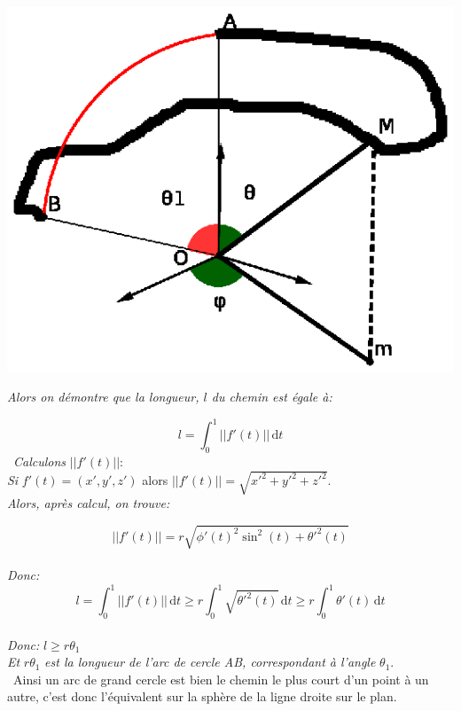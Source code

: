 \documentclass[a4paper, 12pt, twoside]{book}
\begin{document}
\includegraphics[scale=0.9]{figures/coordonneespheriques1.eps} 


\textit{Alors on démontre que la longueur, $l$ du chemin est égale à:}\

 $$ l=\int_{0}^{1} ||{f'}(t)|| \, \mathrm{d}t $$\
 \textit{Calculons} $||{f'}(t)||$:\\
 
 
 \textit{Si} ${f'}(t)=(x',y',z')$ alors $||{f'}(t)||=\sqrt{x'^2+y'^2+z'^2}$.\\
 
 \textit{Alors, après calcul, on trouve:}\
 
 $$||{f'}(t)||=r\sqrt{\phi'(t)^2\sin^2(t)+\theta'^2(t)}$$\\
 
 \textit{Donc:}\\
 
 $$ l=\int_{0}^{1} ||{f'}(t)|| \, \mathrm{d}t \ge r\int_{0}^{1} \sqrt{\theta'^2(t)} \, \mathrm{d}t\ge r\int_{0}^{1} \theta'(t) \, \mathrm{d}t$$\\
 
 \textit{Donc:} $l\ge r\theta_{1}$\\
 
 \textit{Et} $r\theta_{1}$ \textit{est la longueur de l'arc de cercle AB, correspondant à l'angle} $\theta_{1}$.\\
 
 




 \    
     Ainsi un arc de  grand cercle est bien le chemin le plus court d'un point à un autre, c'est donc l'équivalent sur la sphère de la ligne droite sur le plan. \\
     
\end{document}
